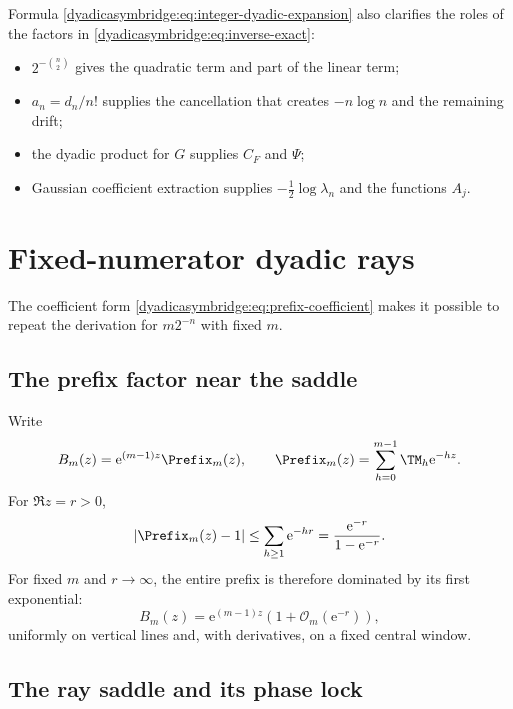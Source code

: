 \documentclass[11pt,oneside]{article}
\theoremstyle{definition}
\theoremstyle{remark}
\newcommand{\e}{\mathrm e}
\newcommand{\bigO}{\mathcal O}
\begin{document}
Formula \eqref{dyadicasymbridge:eq:integer-dyadic-expansion} also clarifies the roles of the factors in
\eqref{dyadicasymbridge:eq:inverse-exact}:
\begin{itemize}
\item $2^{-\binom n2}$ gives the quadratic term and part of the linear term;
\item $a_n=d_n/n!$ supplies the cancellation that creates $-n\log n$ and the remaining drift;
\item the dyadic product for $G$ supplies $C_F$ and $\Psi$;
\item Gaussian coefficient extraction supplies $-\tfrac12\log\lambda_n$ and the functions $A_j$.
\end{itemize}

\section{Fixed-numerator dyadic rays}
\label{dyadicasymbridge:sec:fixed-numerator}

The coefficient form \eqref{dyadicasymbridge:eq:prefix-coefficient} makes it possible to repeat the derivation for $m2^{-n}$ with fixed $m$.

\subsection{The prefix factor near the saddle}

Write
\begin{equation}
 B_m(z)=\e^{(m-1)z}\Prefix_m(z),
 \qquad
 \Prefix_m(z)=\sum_{h=0}^{m-1}\TM_h\e^{-hz}.
\label{dyadicasymbridge:eq:Sm-def}
\end{equation}
For $\Re z=r>0$,
\begin{equation}
 |\Prefix_m(z)-1|
 \le\sum_{h\ge1}\e^{-hr}
 =\frac{\e^{-r}}{1-\e^{-r}}.
\label{dyadicasymbridge:eq:Sm-bound}
\end{equation}
For fixed $m$ and $r\to\infty$, the entire prefix is therefore dominated by its first exponential:
\begin{equation}
 B_m(z)=\e^{(m-1)z}\left(1+\bigO_m(\e^{-r})\right),
\label{dyadicasymbridge:eq:Bm-dominant}
\end{equation}
uniformly on vertical lines and, with derivatives, on a fixed central window.

\subsection{The ray saddle and its phase lock}
\end{document}
